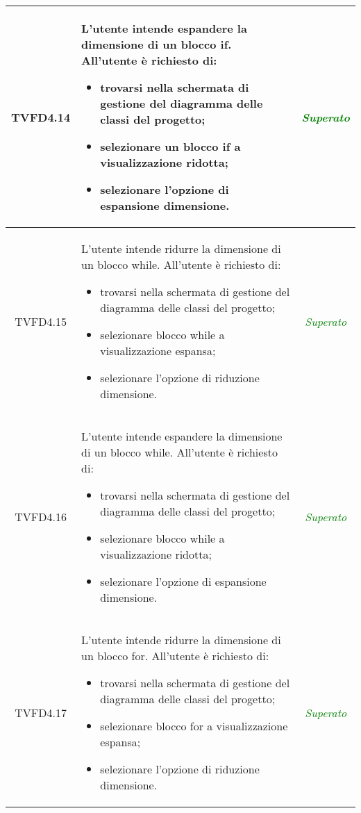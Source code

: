 \begin{longtable}{|c|>{}m{8cm}|c|}
\hypertarget{TVFD4.14}{TVFD4.14} & L'utente intende espandere la dimensione di un blocco if.
All'utente è richiesto di:
\begin{itemize}
	\item trovarsi nella schermata di gestione del diagramma delle classi del progetto;
	\item selezionare un blocco if a visualizzazione ridotta;
	\item selezionare l'opzione di espansione dimensione.
\end{itemize} & \textcolor{Green}{\textit{Superato}}\\ \hline

\hypertarget{TVFD4.15}{TVFD4.15} & L'utente intende ridurre la dimensione di un blocco while.
All'utente è richiesto di:
\begin{itemize}
	\item trovarsi nella schermata di gestione del diagramma delle classi del progetto;
	\item selezionare blocco while a visualizzazione espansa;
	\item selezionare l'opzione di riduzione dimensione.
\end{itemize} & \textcolor{Green}{\textit{Superato}}\\ \hline

\hypertarget{TVFD4.16}{TVFD4.16} & L'utente intende espandere la dimensione di un blocco while.
All'utente è richiesto di:
\begin{itemize}
	\item trovarsi nella schermata di gestione del diagramma delle classi del progetto;
	\item selezionare blocco while a visualizzazione ridotta;
	\item selezionare l'opzione di espansione dimensione.
\end{itemize} & \textcolor{Green}{\textit{Superato}}\\ \hline

\hypertarget{TVFD4.17}{TVFD4.17} & L'utente intende ridurre la dimensione di un blocco for.
All'utente è richiesto di:
\begin{itemize}
	\item trovarsi nella schermata di gestione del diagramma delle classi del progetto;
	\item selezionare blocco for a visualizzazione espansa;
	\item selezionare l'opzione di riduzione dimensione.
\end{itemize} & \textcolor{Green}{\textit{Superato}}\\ \hline


\end{longtable}
